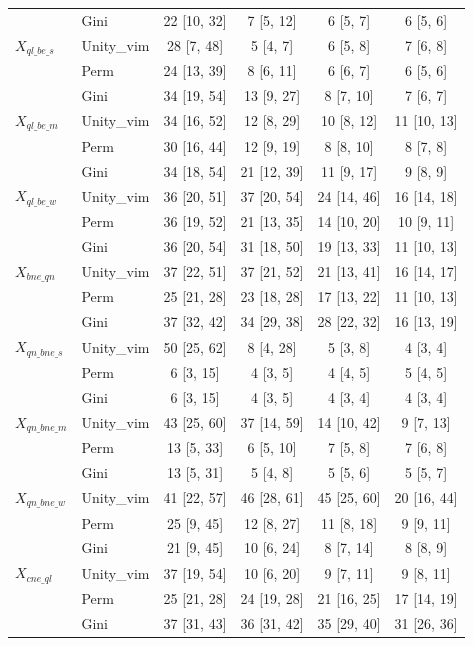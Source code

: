 \begin{tabular}{llcccc}
 & Gini & 22 [10, 32] & 7 [5, 12] & 6 [5, 7] & 6 [5, 6]\\
$X_{ql\_be\_s}$ & Unity\_vim & 28 [7, 48] & 5 [4, 7] & 6 [5, 8] & 7 [6, 8]\\
 & Perm & 24 [13, 39] & 8 [6, 11] & 6 [6, 7] & 6 [5, 6]\\
 & Gini & 34 [19, 54] & 13 [9, 27] & 8 [7, 10] & 7 [6, 7]\\
$X_{ql\_be\_m}$ & Unity\_vim & 34 [16, 52] & 12 [8, 29] & 10 [8, 12] & 11 [10, 13]\\
 & Perm & 30 [16, 44] & 12 [9, 19] & 8 [8, 10] & 8 [7, 8]\\
 & Gini & 34 [18, 54] & 21 [12, 39] & 11 [9, 17] & 9 [8, 9]\\
$X_{ql\_be\_w}$ & Unity\_vim & 36 [20, 51] & 37 [20, 54] & 24 [14, 46] & 16 [14, 18]\\
 & Perm & 36 [19, 52] & 21 [13, 35] & 14 [10, 20] & 10 [9, 11]\\
 & Gini & 36 [20, 54] & 31 [18, 50] & 19 [13, 33] & 11 [10, 13]\\
$X_{bne\_qn}$ & Unity\_vim & 37 [22, 51] & 37 [21, 52] & 21 [13, 41] & 16 [14, 17]\\
 & Perm & 25 [21, 28] & 23 [18, 28] & 17 [13, 22] & 11 [10, 13]\\
 & Gini & 37 [32, 42] & 34 [29, 38] & 28 [22, 32] & 16 [13, 19]\\
$X_{qn\_bne\_s}$ & Unity\_vim & 50 [25, 62] & 8 [4, 28] & 5 [3, 8] & 4 [3, 4]\\
 & Perm & 6 [3, 15] & 4 [3, 5] & 4 [4, 5] & 5 [4, 5]\\
 & Gini & 6 [3, 15] & 4 [3, 5] & 4 [3, 4] & 4 [3, 4]\\
$X_{qn\_bne\_m}$ & Unity\_vim & 43 [25, 60] & 37 [14, 59] & 14 [10, 42] & 9 [7, 13]\\
 & Perm & 13 [5, 33] & 6 [5, 10] & 7 [5, 8] & 7 [6, 8]\\
 & Gini & 13 [5, 31] & 5 [4, 8] & 5 [5, 6] & 5 [5, 7]\\
$X_{qn\_bne\_w}$ & Unity\_vim & 41 [22, 57] & 46 [28, 61] & 45 [25, 60] & 20 [16, 44]\\
 & Perm & 25 [9, 45] & 12 [8, 27] & 11 [8, 18] & 9 [9, 11]\\
 & Gini & 21 [9, 45] & 10 [6, 24] & 8 [7, 14] & 8 [8, 9]\\
$X_{cne\_ql}$ & Unity\_vim & 37 [19, 54] & 10 [6, 20] & 9 [7, 11] & 9 [8, 11]\\
 & Perm & 25 [21, 28] & 24 [19, 28] & 21 [16, 25] & 17 [14, 19]\\
 & Gini & 37 [31, 43] & 36 [31, 42] & 35 [29, 40] & 31 [26, 36]\\

\end{tabular}
